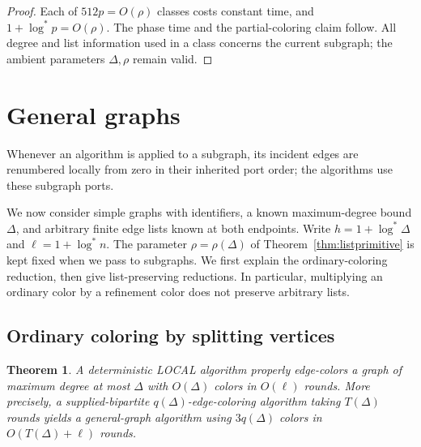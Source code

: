 \documentclass[11pt]{article}
\newtheorem{theorem}{Theorem}[section]
\theoremstyle{definition}
\theoremstyle{remark}
\newcommand{\logstar}{\log^*}
\begin{document}
\begin{proof}
Each of $512p=O(\rho)$ classes costs constant time, and
$1+\logstar p=O(\rho)$. The phase time and the partial-coloring claim
follow. All degree and list information used in a class concerns the
current subgraph; the ambient parameters $\Delta,\rho$ remain valid.
\end{proof}


\section{General graphs}
\label{sec:general}

Whenever an algorithm is applied to a subgraph, its incident edges are renumbered locally from zero in their inherited port order; the algorithms use these subgraph ports.

We now consider simple graphs with identifiers, a known maximum-degree
bound $\Delta$, and arbitrary finite edge lists known at both endpoints.
Write $h=1+\log^*\Delta$ and $\ell=1+\log^*n$.  The parameter
$\rho=\rho(\Delta)$ of Theorem~\ref{thm:listprimitive} is kept fixed when
we pass to subgraphs.  We first explain the ordinary-coloring reduction,
then give list-preserving reductions.  In particular, multiplying an
ordinary color by a refinement color does not preserve arbitrary lists.

\subsection{Ordinary coloring by splitting vertices}

\begin{theorem}\label{thm:generalordinary}
A deterministic LOCAL algorithm properly edge-colors a graph of maximum
degree at most $\Delta$ with $O(\Delta)$ colors in $O(\ell)$ rounds.
More precisely, a supplied-bipartite $q(\Delta)$-edge-coloring algorithm
taking $T(\Delta)$ rounds yields a general-graph algorithm using
$3q(\Delta)$ colors in $O(T(\Delta)+\ell)$ rounds.
\end{theorem}
\end{document}
